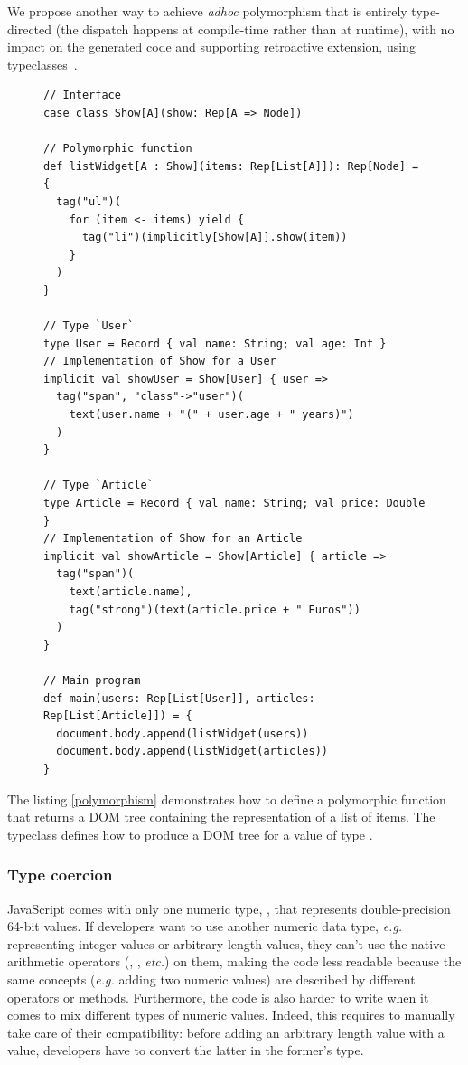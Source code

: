 \documentclass[american,english,runningheads]{llncs}
\newcommand{\eg}{\emph{e.g.}}
\newcommand{\etc}{\emph{etc.}}
\begin{document}
We propose another way to achieve \emph{adhoc} polymorphism that is entirely type-directed (the dispatch happens at compile-time rather than at runtime), with no impact on the generated code and supporting retroactive extension, using typeclasses~\cite{Wadler89_AdhocPolymorphism,Odersky06_Typeclasses,Oliveira10_Typeclasses}.

\begin{figure}
\begin{lstlisting}[label=polymorphism,caption=Adhoc polymorphism using typeclasses]
// Interface
case class Show[A](show: Rep[A => Node])

// Polymorphic function
def listWidget[A : Show](items: Rep[List[A]]): Rep[Node] = {
  tag("ul")(
    for (item <- items) yield {
      tag("li")(implicitly[Show[A]].show(item))
    }
  )
}

// Type `User`
type User = Record { val name: String; val age: Int }
// Implementation of Show for a User
implicit val showUser = Show[User] { user =>
  tag("span", "class"->"user")(
    text(user.name + "(" + user.age + " years)")
  )
}

// Type `Article`
type Article = Record { val name: String; val price: Double }
// Implementation of Show for an Article
implicit val showArticle = Show[Article] { article =>
  tag("span")(
    text(article.name),
    tag("strong")(text(article.price + " Euros"))
  )
}

// Main program
def main(users: Rep[List[User]], articles: Rep[List[Article]]) = {
  document.body.append(listWidget(users))
  document.body.append(listWidget(articles))
}
\end{lstlisting}
\end{figure}

The listing \ref{polymorphism} demonstrates how to define a polymorphic  function that returns a DOM tree containing the representation of a list of items. The  typeclass defines how to produce a DOM tree for a value of type .

\subsubsection{Type coercion}

JavaScript comes with only one numeric type, , that represents double-precision 64-bit values. If developers want to use another numeric data type, \eg{} representing integer values or arbitrary length values, they can’t use the native arithmetic operators (\code{+}, \code{-}, \etc) on them, making the code less readable because the same concepts (\eg{} adding two numeric values) are described by different operators or methods. Furthermore, the code is also harder to write when it comes to mix different types of numeric values. Indeed, this requires to manually take care of their compatibility: before adding an arbitrary length value with a  value, developers have to convert the latter in the former’s type.
\end{document}
